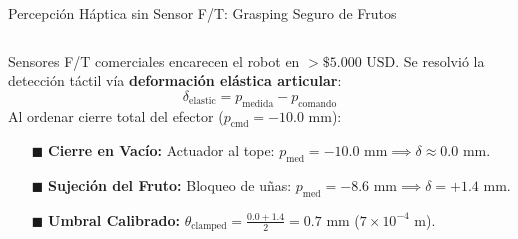 \begin{frame}{Percepción Háptica sin Sensor F/T: Grasping Seguro de Frutos}
  \vspace{0.8mm}
  \begin{columns}[T, onlytextwidth]
    \begin{column}{0.485\textwidth}
      \begin{tcolorbox}[
        enhanced,
        colback=WhiteBg,
        colframe=UCNBlue,
        arc=\CardArc,
        boxrule=\CardRule,
        height=\CardHeightDouble,
        title={\CardTitleFont Analytical Pseudo-Force Estimator},
        colbacktitle=UCNBlue,
        coltitle=WhiteBg,
        top=1.0mm, bottom=1.0mm, left=1.6mm, right=1.6mm
      ]
        {\BodyFont
        Sensores F/T comerciales encarecen el robot en $> \$5.000\text{ USD}$. Se resolvió la detección táctil vía \textbf{deformación elástica articular}:
        \vspace{-0.5mm}
        \[
          \delta_{\text{elastic}} = p_{\text{medida}} - p_{\text{comando}}
        \]
        \vspace{-1.5mm}
        Al ordenar cierre total del efector ($p_{\text{cmd}} = -10.0\text{ mm}$):
        \vspace{0.4mm}
        \begin{itemize}\setlength{\itemsep}{0.8pt}
          \item[\textcolor{AlertRed}{$\blacksquare$}] \textbf{Cierre en Vacío:} Actuador al tope: $p_{\text{med}} = -10.0\text{ mm} \implies \delta \approx 0.0\text{ mm}$.
          \item[\textcolor{AgriGreen}{$\blacksquare$}] \textbf{Sujeción del Fruto:} Bloqueo de uñas: $p_{\text{med}} = -8.6\text{ mm} \implies \delta = +1.4\text{ mm}$.
          \item[\textcolor{GoldGORE}{$\blacksquare$}] \textbf{Umbral Calibrado:} $\theta_{\text{clamped}} = \frac{0.0 + 1.4}{2} = 0.7\text{ mm}$ ($7 \times 10^{-4}\text{ m}$).
        \end{itemize}}
      \end{tcolorbox}
    \end{column}


\end{columns}
\end{frame}
